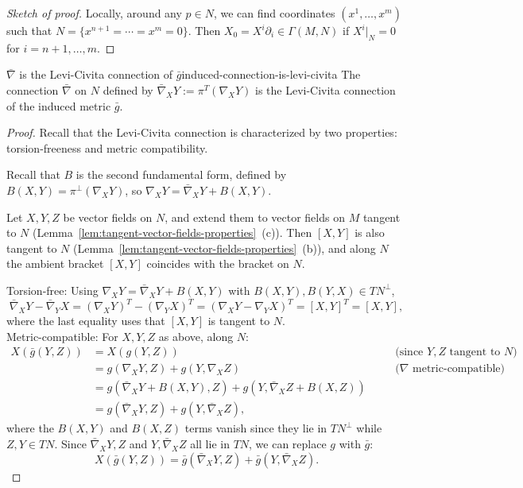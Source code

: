 \begin{proof}[Sketch of proof]
    Locally, around any $p \in N$, we can find coordinates $(x^1, \ldots, x^m)$ such that $N = \{x^{n+1} = \cdots = x^m = 0\}$. Then $X_0 = X^i \partial_i \in \Gamma(M,N)$ if $X^i\big|_N = 0$ for $i = n+1, 
    \ldots, m$.
\end{proof}


\begin{colortheo}{$\bar\nabla$ is the Levi-Civita connection of $\bar g$}{induced-connection-is-levi-civita}
The connection $\bar\nabla$ on $N$ defined by $\bar\nabla_X Y := \pi^T(\nabla_X Y)$ is the Levi-Civita connection of the induced metric $\bar g$.
\end{colortheo}


\begin{proof}
    Recall that the Levi-Civita connection is characterized by two properties: torsion-freeness and metric compatibility.
    
    Recall that $B$ is the second fundamental form, defined by $B(X,Y) = \pi^\perp(\nabla_X Y)$, so $\nabla_X Y = \bar\nabla_X Y + B(X,Y)$.

Let $X, Y, Z$ be vector fields on $N$, and extend them to vector fields on $M$ tangent to $N$ (Lemma~\ref{lem:tangent-vector-fields-properties}~(c)). Then $[X, Y]$ is also tangent to $N$ (Lemma~\ref{lem:tangent-vector-fields-properties}~(b)), and along $N$ the ambient bracket $[X, Y]$ coincides with the bracket on $N$.

Torsion-free:
Using $\nabla_X Y = \bar\nabla_X Y + B(X, Y)$ with $B(X, Y), B(Y, X) \in TN^\perp$,
\[
\bar\nabla_X Y - \bar\nabla_Y X = (\nabla_X Y)^T - (\nabla_Y X)^T = (\nabla_X Y - \nabla_Y X)^T = [X, Y]^T = [X, Y],
\]
where the last equality uses that $[X, Y]$ is tangent to $N$.\\
Metric-compatible: For $X, Y, Z$ as above, along $N$:
\begin{align*}
X(\bar g(Y, Z)) 
&= X(g(Y, Z)) &&\quad\text{(since } Y, Z \text{ tangent to } N) \\
&= g(\nabla_X Y, Z) + g(Y, \nabla_X Z) &&\quad\text{(}\nabla \text{ metric-compatible)} \\
&= g(\bar\nabla_X Y + B(X, Y), Z) + g(Y, \bar\nabla_X Z + B(X, Z)) \\
&= g(\bar\nabla_X Y, Z) + g(Y, \bar\nabla_X Z),
\end{align*}
where the $B(X, Y)$ and $B(X, Z)$ terms vanish since they lie in $TN^\perp$ while $Z, Y \in TN$. Since $\bar\nabla_X Y, Z$ and $Y, \bar\nabla_X Z$ all lie in $TN$, we can replace $g$ with $\bar g$:
\[
X(\bar g(Y, Z)) = \bar g(\bar\nabla_X Y, Z) + \bar g(Y, \bar\nabla_X Z).
\]
\end{proof}







